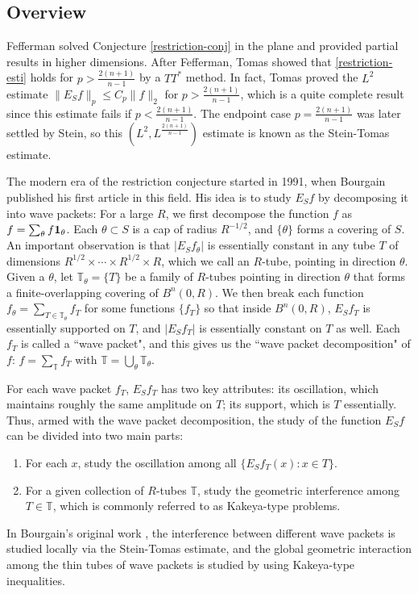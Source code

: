 \documentclass{amsart}
\numberwithin{equation}{section}
\newcommand{\ZT}{\mathbb{T}}
\newcommand{\Id}{{\bf 1}}
\begin{document}
\subsection{Overview} 

Fefferman \cite{Fefferman-inequalities} solved Conjecture \ref{restriction-conj} in the plane and provided partial results in higher dimensions. 
After Fefferman, Tomas \cite{Tomas} showed that \eqref{restriction-esti} holds for $p>\frac{2(n+1)}{n-1}$ by a $TT^\ast$ method. 
In fact, Tomas proved the $L^2$ estimate $\|E_Sf\|_p\leq C_p\|f\|_2$ for $p>\frac{2(n+1)}{n-1}$, which is a quite complete result since this estimate fails if $p<\frac{2(n+1)}{n-1}$. 
The endpoint case $p=\frac{2(n+1)}{n-1}$ was later settled by Stein, so this $(L^2, L^{\frac{2(n+1)}{n-1}})$ estimate is known as the Stein-Tomas estimate. 

\smallskip

The modern era of the restriction conjecture started in 1991, when Bourgain published his first article \cite{Bourgain-Besicovitch} in this field. 
His idea is to study $E_Sf$ by decomposing it into wave packets: For a large $R$, we first decompose the function $f$ as $f=\sum_\theta f\Id_\theta$. 
Each $\theta\subset S$ is a cap of radius $R^{-1/2}$, and $\{\theta\}$ forms a covering of $S$. 
An important observation is that  $|E_Sf_{\theta}|$ is essentially constant in any tube $T$ of dimensions $R^{1/2}\times\cdots\times R^{1/2}\times R$, which we call an $R$-tube, pointing in direction $\theta$.
Given a $\theta$, let $\ZT_\theta=\{T\}$ be a family of $R$-tubes pointing in direction $\theta$ that forms a finite-overlapping covering of $B^n(0,R)$. 
We then break each function $f_\theta=\sum_{T\in\ZT_\theta}f_T$ for some functions $\{f_T\}$ so that inside $B^n(0,R)$, $E_Sf_T$ is essentially supported on $T$, and $|E_Sf_T|$ is essentially constant on $T$ as well. 
Each $f_T$ is called a ``wave packet", and this gives us the ``wave packet decomposition" of $f$: $f=\sum_{\ZT}f_T$ with $\ZT=\bigcup_\theta\ZT_\theta$. 

For each wave packet $f_T$, $E_Sf_T$ has two key attributes: its oscillation, which maintains roughly the same amplitude on $T$; its support, which is $T$ essentially. 
Thus, armed with the wave packet decomposition, the study of the function $E_Sf$ can be divided into two main parts: 
\begin{enumerate}
    \item For each $x$, study the oscillation among all $\{E_Sf_T(x):x\in T\}$.
    \item For a given collection of $R$-tubes $\ZT$, study the geometric interference among $T\in\ZT$, which is commonly referred to as Kakeya-type problems.
\end{enumerate}
In Bourgain's original work \cite{Bourgain-Besicovitch}, the interference between different wave packets is studied locally via the Stein-Tomas estimate, and the global geometric interaction among the thin tubes of wave packets is studied by using Kakeya-type inequalities. 
\end{document}
